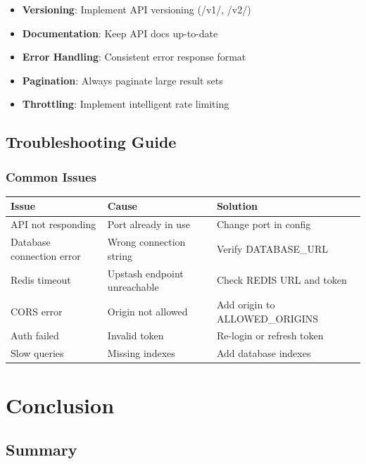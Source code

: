 \documentclass[12pt,a4paper]{report}
\begin{document}
\begin{itemize}
    \item \textbf{Versioning}: Implement API versioning (/v1/, /v2/)
    \item \textbf{Documentation}: Keep API docs up-to-date
    \item \textbf{Error Handling}: Consistent error response format
    \item \textbf{Pagination}: Always paginate large result sets
    \item \textbf{Throttling}: Implement intelligent rate limiting
\end{itemize}

\section{Troubleshooting Guide}

\subsection{Common Issues}

\begin{longtable}{|p{3cm}|p{4cm}|p{2.5cm}|}
\hline
\textbf{Issue} & \textbf{Cause} & \textbf{Solution} \\
\hline
API not responding & Port already in use & Change port in config \\
\hline
Database connection error & Wrong connection string & Verify DATABASE\_URL \\
\hline
Redis timeout & Upstash endpoint unreachable & Check REDIS URL and token \\
\hline
CORS error & Origin not allowed & Add origin to ALLOWED\_ORIGINS \\
\hline
Auth failed & Invalid token & Re-login or refresh token \\
\hline
Slow queries & Missing indexes & Add database indexes \\
\hline
\end{longtable}

\newpage

\chapter{Conclusion}

\section{Summary}
\end{document}
